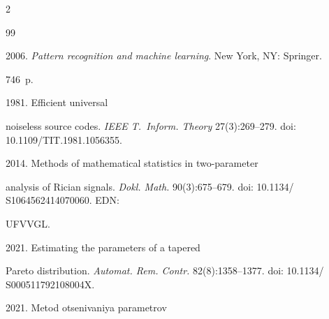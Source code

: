   \begin{multicols}{2}





\renewcommand{\bibname}{\protect\rmfamily References}







{\small\frenchspacing


 {%




 \begin{thebibliography}{99} 


 


 \vspace*{-3pt}


 




 2006. \textit{Pattern recognition and machine learning}. New York, NY: Springer. 


746~p. %




 1981. Efficient universal 


noiseless source codes. \textit{IEEE T.~Inform. Theory} 27(3):269--279.  doi: 10.1109/TIT.1981.1056355.




 2014. Methods of mathematical statistics in two-parameter 


analysis of Rician signals. \textit{Dokl. Math.} 90(3):675--679. doi: 10.1134/ S1064562414070060. EDN: 


UFVVGL.




 2021. Estimating the parameters of a tapered 


Pareto distribution. \textit{Automat. Rem. Contr.} 82(8):1358--1377. doi: 10.1134/ S000511792108004X.




 2021. Metod otsenivaniya parametrov 



\end{thebibliography}}}
\end{multicols}
